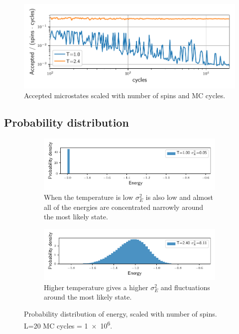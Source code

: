 \begin{figure}[H]
  \centering
  \includegraphics[width=\textwidth]{../figures/accepted.pdf}
  \caption{Accepted microstates scaled with number of spins and MC cycles.}
  \label{fig:accepted}
\end{figure}

\subsection{Probability distribution}

\begin{figure}[htp]
  \begin{subfigure}[t]{\textwidth} %
    \centering
    \includegraphics[width=\linewidth]{../figures/distribution_0.pdf}
    \caption{When the temperature is low $\sigma_E^2$ is also low and almost all
    of the energies are concentrated narrowly around the most likely
    state.}
    \label{fig:sub-first}
  \end{subfigure}
  \hfill
  \newline
  \begin{subfigure}[t]{\textwidth}
    \centering
    \includegraphics[width=\linewidth]{../figures/distribution_5.pdf}
    \caption{Higher temperature gives a higher $\sigma_E^2$ and fluctuations around
    the most likely state.}
    \label{fig:sub-second}
  \end{subfigure}
  \label{fig:distribution}
  \caption{Probability distribution of energy, scaled with number of spins. L=20
  MC cycles = \num{1e6}.}
\end{figure}



